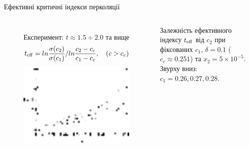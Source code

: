 \documentclass[10pt]{beamer}
\begin{document}
\begin{frame}{Ефективні критичні індекси перколяції}
\footnotesize

\begin{columns}[T,onlytextwidth]
      \begin{figure}
        \centering
        Експеримент: $t\approx 1.5 \div 2.0$ та вище
        $$t_{\rm eff} = ln \frac{\sigma(c_2)}{\sigma(c_1)} / ln \frac{c_2-c_c}{c_1 - c_c}, \quad (c>c_c)$$
        \includegraphics[width=0.99\textwidth]{images/teff.eps}
      \end{figure}
        Залежність ефективного індексу $t_{\rm eff}$ від $c_2$ при фіксованих $c_1$, $\delta=0.1$ ($c_c \approx 0.251$) та $x_2 = 5\times 10^{-5}$. Звурху вниз: $c_1 = 0.26, 0.27, 0.28$.\\


\end{columns}
\end{frame}
\end{document}
